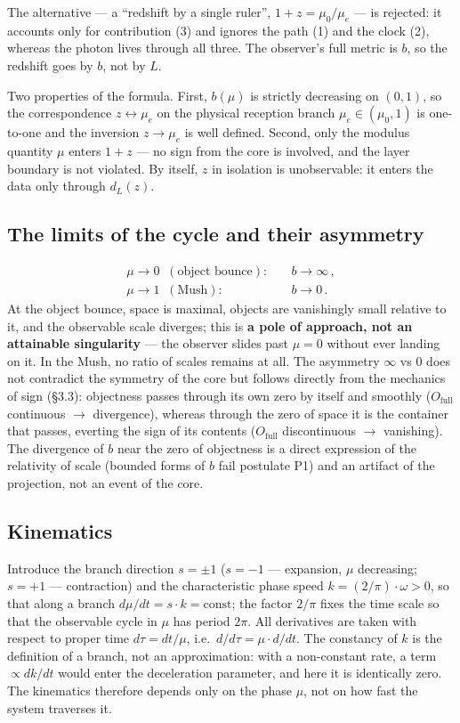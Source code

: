 \documentclass{article}
\begin{document}
The alternative --- a ``redshift by a single ruler'', $1 + z = \mu_0/\mu_e$ --- is rejected: it accounts only for contribution (3) and ignores the path (1) and the clock (2), whereas the photon lives through all three. The observer's full metric is $b$, so the redshift goes by $b$, not by $L$.

Two properties of the formula. First, $b(\mu)$ is strictly decreasing on $(0, 1)$, so the correspondence $z \leftrightarrow \mu_e$ on the physical reception branch $\mu_e \in (\mu_0, 1)$ is one-to-one and the inversion $z \to \mu_e$ is well defined. Second, only the modulus quantity $\mu$ enters $1 + z$ --- no sign from the core is involved, and the layer boundary is not violated. By itself, $z$ in isolation is unobservable: it enters the data only through $d_L(z)$.

\subsection{The limits of the cycle and their asymmetry}

\begin{align*}
\mu \to 0 \;\;(\text{object bounce}): &\quad b \to \infty\,, \\
\mu \to 1 \;\;(\text{Mush}): &\quad b \to 0\,.
\end{align*}
At the object bounce, space is maximal, objects are vanishingly small relative to it, and the observable scale diverges; this is \textbf{a pole of approach, not an attainable singularity} --- the observer slides past $\mu = 0$ without ever landing on it. In the Mush, no ratio of scales remains at all. The asymmetry $\infty$ vs $0$ does not contradict the symmetry of the core but follows directly from the mechanics of sign (\S3.3): objectness passes through its own zero by itself and smoothly ($O_{\text{full}}$ continuous $\to$ divergence), whereas through the zero of space it is the container that passes, everting the sign of its contents ($O_{\text{full}}$ discontinuous $\to$ vanishing). The divergence of $b$ near the zero of objectness is a direct expression of the relativity of scale (bounded forms of $b$ fail postulate P1) and an artifact of the projection, not an event of the core.

\subsection{Kinematics}

Introduce the branch direction $s = \pm 1$ ($s = -1$ --- expansion, $\mu$ decreasing; $s = +1$ --- contraction) and the characteristic phase speed $k = (2/\pi)\cdot\omega > 0$, so that along a branch $d\mu/dt = s\cdot k = \text{const}$; the factor $2/\pi$ fixes the time scale so that the observable cycle in $\mu$ has period $2\pi$. All derivatives are taken with respect to proper time $d\tau = dt/\mu$, i.e.\ $d/d\tau = \mu\cdot d/dt$. The constancy of $k$ is the definition of a branch, not an approximation: with a non-constant rate, a term $\propto dk/dt$ would enter the deceleration parameter, and here it is identically zero. The kinematics therefore depends only on the phase $\mu$, not on how fast the system traverses it.
\end{document}
